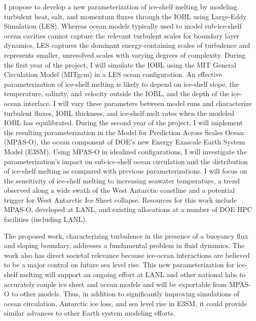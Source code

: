\documentclass[letterpaper,10pt]{report}
\begin{document}
I propose to develop a new parameterization of ice-shelf melting by modeling turbulent heat, salt, and momentum fluxes through the IOBL using Large-Eddy Simulation (LES). Whereas ocean models typically used to model sub-ice-shelf ocean cavities cannot capture the relevant turbulent scales for boundary layer dynamics, LES captures the dominant energy-containing scales of turbulence and represents smaller, unresolved scales with varying degrees of complexity. During the first year of the project, I will simulate the IOBL using the MIT General Circulation Model (MITgcm) in a LES ocean configuration. An effective parameterization of ice-shelf melting is likely to depend on ice-shelf slope, the temperature, salinity, and velocity outside the IOBL, and the depth of the ice-ocean interface. I will vary these parameters between model runs and characterize turbulent fluxes, IOBL thickness, and ice-shelf melt rates when the modeled IOBL has equilibrated.  During the second year of the project, I will implement the resulting parameterization in the Model for Prediction Across Scales Ocean (MPAS-O), the ocean component of DOE’s new Energy Exascale Earth System Model (E3SM). Using MPAS-O in idealized configurations, I will investigate the parameterization’s impact on sub-ice-shelf ocean circulation and the distribution of ice-shelf melting as compared with previous parameterizations. I will focus on the sensitivity of ice-shelf melting to increasing seawater temperature, a trend observed along a wide swath of the West Antarctic coastline and a potential trigger for West Antarctic Ice Sheet collapse. Resources for this work include MPAS-O, developed at LANL, and existing allocations at a number of DOE HPC facilities (including LANL). 

The proposed work, characterizing turbulence in the presence of a buoyancy flux and sloping boundary, addresses a fundamental problem in fluid dynamics. The work also has direct societal relevance because ice-ocean interactions are believed to be a major control on future sea level rise. This new parameterization for ice-shelf melting will support an ongoing effort at LANL and other national labs to accurately couple ice sheet and ocean models and will be exportable from MPAS-O to other models. Thus, in addition to significantly improving simulations of ocean circulation, Antarctic ice loss, and sea level rise in E3SM, it could provide similar advances to other Earth system modeling efforts. 

\end{document}
